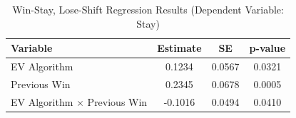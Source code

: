 \begin{table}[htbp]
\centering
\caption{Win-Stay, Lose-Shift Regression Results (Dependent Variable: Stay)}
\begin{tabular}{lccc}
\toprule
Variable & Estimate & SE & p-value \\
\midrule
EV Algorithm & 0.1234 & 0.0567 & 0.0321 \\
Previous Win & 0.2345 & 0.0678 & 0.0005 \\
EV Algorithm $\times$ Previous Win & -0.1016 & 0.0494 & 0.0410 \\
\bottomrule
\end{tabular}
\label{tab:win_stay}
\end{table}